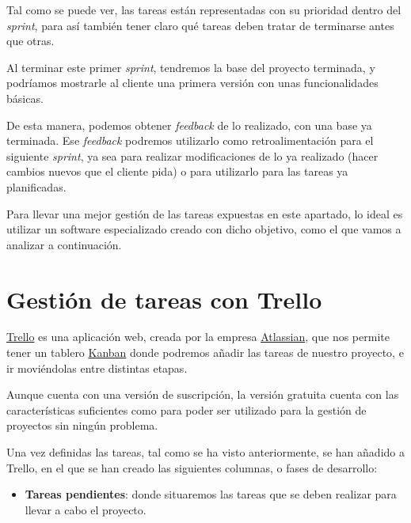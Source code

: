 \documentclass{\ClassPath/viu-tfm-template}
\begin{document}
Tal como se puede ver, las tareas están representadas con su prioridad dentro del \textit{sprint}, para así también tener claro qué tareas deben tratar de terminarse antes que otras.

Al terminar este primer \textit{sprint}, tendremos la base del proyecto terminada, y podríamos mostrarle al cliente una primera versión con unas funcionalidades básicas.

De esta manera, podemos obtener \textit{feedback} de lo realizado, con una base ya terminada. Ese \textit{feedback} podremos utilizarlo como retroalimentación para el siguiente \textit{sprint}, ya sea para realizar modificaciones de lo ya realizado (hacer cambios nuevos que el cliente pida) o para utilizarlo para las tareas ya planificadas.

Para llevar una mejor gestión de las tareas expuestas en este apartado, lo ideal es utilizar un software especializado creado con dicho objetivo, como el que vamos a analizar a continuación.

\section{Gestión de tareas con Trello}

\href{https://trello.com/}{Trello} es una aplicación web, creada por la empresa \href{https://www.atlassian.com/}{Atlassian}, que nos permite tener un tablero \href{https://en.wikipedia.org/wiki/Kanban_(development)}{Kanban} donde podremos añadir las tareas de nuestro proyecto, e ir moviéndolas entre distintas etapas.

Aunque cuenta con una versión de suscripción, la versión gratuita cuenta con las características suficientes como para poder ser utilizado para la gestión de proyectos sin ningún problema.

Una vez definidas las tareas, tal como se ha visto anteriormente, se han añadido a Trello, en el que se han creado las siguientes columnas, o fases de desarrollo:

\begin{itemize}
    \item \textbf{Tareas pendientes}: donde situaremos las tareas que se deben realizar para llevar a cabo el proyecto.

\end{itemize}
\end{document}
